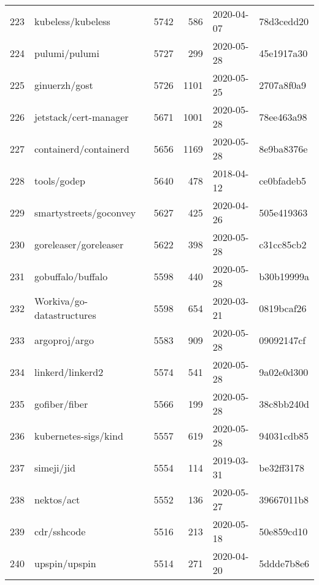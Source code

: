 \begin{longtable}{llrrll}
    223 &                                  kubeless/kubeless &   5742 &    586 & 2020-04-07 &  78d3cedd20 \\
    224 &                                      pulumi/pulumi &   5727 &    299 & 2020-05-28 &  45e1917a30 \\
    225 &                                      ginuerzh/gost &   5726 &   1101 & 2020-05-25 &  2707a8f0a9 \\
    226 &                              jetstack/cert-manager &   5671 &   1001 & 2020-05-28 &  78ee463a98 \\
    227 &                              containerd/containerd &   5656 &   1169 & 2020-05-28 &  8e9ba8376e \\
    228 &                                        tools/godep &   5640 &    478 & 2018-04-12 &  ce0bfadeb5 \\
    229 &                             smartystreets/goconvey &   5627 &    425 & 2020-04-26 &  505e419363 \\
    230 &                              goreleaser/goreleaser &   5622 &    398 & 2020-05-28 &  c31cc85cb2 \\
    231 &                                  gobuffalo/buffalo &   5598 &    440 & 2020-05-28 &  b30b19999a \\
    232 &                          Workiva/go-datastructures &   5598 &    654 & 2020-03-21 &  0819bcaf26 \\
    233 &                                      argoproj/argo &   5583 &    909 & 2020-05-28 &  09092147cf \\
    234 &                                   linkerd/linkerd2 &   5574 &    541 & 2020-05-28 &  9a02e0d300 \\
    235 &                                      gofiber/fiber &   5566 &    199 & 2020-05-28 &  38c8bb240d \\
    236 &                               kubernetes-sigs/kind &   5557 &    619 & 2020-05-28 &  94031cdb85 \\
    237 &                                         simeji/jid &   5554 &    114 & 2019-03-31 &  be32ff3178 \\
    238 &                                         nektos/act &   5552 &    136 & 2020-05-27 &  39667011b8 \\
    239 &                                        cdr/sshcode &   5516 &    213 & 2020-05-18 &  50e859cd10 \\
    240 &                                      upspin/upspin &   5514 &    271 & 2020-04-20 &  5ddde7b8e6 \\

\end{longtable}
